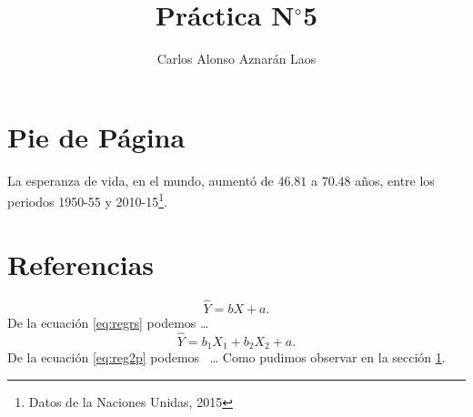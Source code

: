 \documentclass[12pt,a4paper]{article}
\author{Carlos Alonso Aznarán Laos}
\title{Práctica N$^{\circ}$5}
\begin{document}
\maketitle

\section{Pie de Página}\label{sec:pie}
La esperanza de vida, en el mundo, aumentó de $46.81$ a $70.48$ años,
entre los periodos 1950-55 y 2010-15\footnote{Datos de la Naciones Unidas, 2015}.

\section{Referencias}

\begin{equation}
	\hat{Y}=
	bX+a .
	\label{eq:regrs}
\end{equation}
De la ecuación \eqref{eq:regrs} podemos \ldots
\begin{equation}
	\boxed{
		 \hat{Y}=
		 b_{1}X_{1}+
		 b_{2}X_{2}+
		 a}.
	 \label{eq:reg2p}
\end{equation}
De la ecuación \eqref{eq:reg2p}
podemos~\cite{MR3277186,MR3366417,fernandez2016poligono} \ldots
Como pudimos observar en la sección \ref{sec:pie}.


\end{document}
